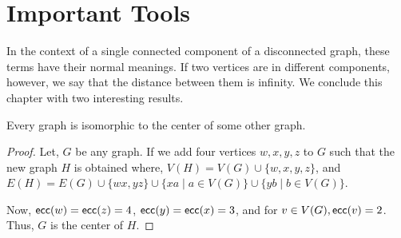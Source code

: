 \documentclass[../basic_graph_theory.tex]{subfiles}
\begin{document}
\section{Important Tools}
In the context of a single connected component of a disconnected graph, these terms have their normal meanings. If two vertices are in different components, however, we say that the distance between them is infinity. We conclude this chapter with two interesting results.

\begin{Thm}{}{}
  Every graph is isomorphic to the center of some other graph.
\end{Thm}
\begin{proof}
  Let, $G$ be any graph. If we add four vertices $w,x,y,z$ to $G$ such that the new graph $H$ is obtained where, $V(H) = V(G) \cup \{w,x,y,z\}$, and $E(H) = E(G) \cup \{wx,yz\} \cup \{xa \mid a \in V(G)\} \cup \{yb \mid b \in V(G)\}$.

  Now, $\operatorname{\mathsf{ecc}}(w)=\operatorname{\mathsf{ecc}}(z)=4$, $\operatorname{\mathsf{ecc}}(y)=\operatorname{\mathsf{ecc}}(x)=3$, and for $v \in V(G), \operatorname{\mathsf{ecc}}(v)=2$. Thus, $G$ is the center of $H$.
\end{proof}
\end{document}
